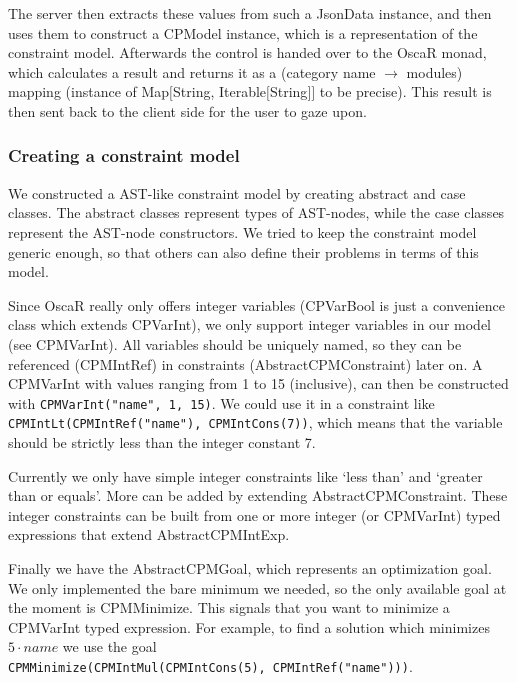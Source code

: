 \documentclass[a4paper]{article}
\begin{document}
The server then extracts these values from such a JsonData instance,
and then uses them to construct a CPModel instance, which is a
representation of the constraint model. Afterwards the control is
handed over to the OscaR monad, which calculates a result and returns
it as a (category name $\rightarrow$ modules) mapping (instance of
Map$[$String, Iterable$[$String$]]$ to be precise).
This result is then sent back to the client side for the user to gaze upon.


\subsubsection{Creating a constraint model}
We constructed a AST-like constraint model by creating 
abstract and case classes. 
The abstract classes represent types of AST-nodes, 
while the case classes represent the AST-node constructors.
We tried to keep the constraint model generic enough,
so that others can also define their problems in terms of this model.

Since OscaR really only offers integer variables 
(CPVarBool is just a convenience class which extends CPVarInt),
we only support integer variables in our model (see CPMVarInt).
All variables should be uniquely named, 
so they can be referenced (CPMIntRef) in constraints (AbstractCPMConstraint) later on.
A CPMVarInt with values ranging from 1 to 15 (inclusive), 
can then be constructed with \verb|CPMVarInt("name", 1, 15)|.
We could use it in a constraint like 
\verb|CPMIntLt(CPMIntRef("name"), CPMIntCons(7))|,
which means that the variable should be strictly less than the integer constant 7.

Currently we only have simple integer constraints
like `less than' and `greater than or equals'.
More can be added by extending AbstractCPMConstraint.
These integer constraints can be built from one or more integer 
(or CPMVarInt) typed expressions that extend AbstractCPMIntExp.

Finally we have the AbstractCPMGoal, 
which represents an optimization goal.
We only implemented the bare minimum we needed,
so the only available goal at the moment is CPMMinimize.
This signals that you want to minimize a CPMVarInt typed
expression.
For example, to find a solution which minimizes $5\cdot name$ we use the goal
\\\verb|CPMMinimize(CPMIntMul(CPMIntCons(5), CPMIntRef("name")))|.
\end{document}
